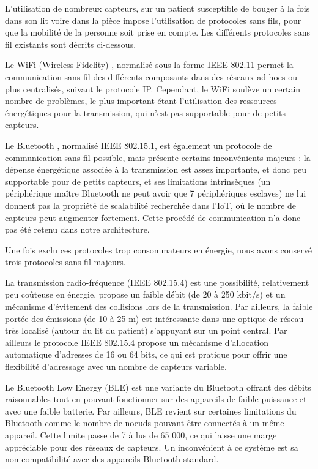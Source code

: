 \documentclass{article}
\begin{document}
L’utilisation de nombreux capteurs, sur un patient susceptible de bouger à la fois dans son lit voire dans la pièce impose l’utilisation de protocoles sans fils, pour que la mobilité de la personne soit prise en compte. Les différents protocoles sans fil existants sont décrits ci-dessous.

Le WiFi (Wireless Fidelity) \cite{Wifi}, normalisé sous la forme IEEE 802.11 permet la communication sans fil des différents composants dans des réseaux ad-hocs ou plus centralisés, suivant le protocole IP. Cependant, le WiFi soulève un certain nombre de problèmes, le plus important étant l'utilisation des ressources énergétiques pour la transmission, qui n’est pas supportable pour de petits capteurs.

Le Bluetooth \cite{Bluetooth}, normalisé IEEE 802.15.1, est également un protocole de communication sans fil possible, mais présente certains inconvénients majeurs : la dépense énergétique associée à la transmission est assez importante, et donc peu supportable pour de petits capteurs, et ses limitations intrinsèques (un périphérique maître Bluetooth ne peut avoir que 7 périphériques esclaves) ne lui donnent pas la propriété de scalabilité recherchée dans l'IoT, où le nombre de capteurs peut augmenter fortement. Cette procédé de communication n'a donc pas été retenu dans notre architecture.

Une fois exclu ces protocoles trop consommateurs en énergie, nous avons conservé trois protocoles sans fil majeurs.

La transmission radio-fréquence (IEEE 802.15.4) \cite{1IEEE802.15.4} \cite{2IEEE802.15.4} est une possibilité, relativement peu coûteuse en énergie, propose un faible débit (de 20 à 250 kbit/s) et un mécanisme d’évitement des collisions lors de la transmission. Par ailleurs, la faible portée des émissions (de 10 à 25 m) est intéressante dans une optique de réseau très localisé (autour du lit du patient) s’appuyant sur un point central. Par ailleurs le protocole IEEE 802.15.4 propose un mécanisme d’allocation automatique d’adresses de 16 ou 64 bits, ce qui est pratique pour offrir une flexibilité d’adressage avec un nombre de capteurs variable.

Le Bluetooth Low Energy (BLE) \cite{BLE} est une variante du Bluetooth offrant des débits raisonnables tout en pouvant fonctionner sur des appareils de faible puissance et avec une faible batterie. Par ailleurs, BLE revient sur certaines limitations du Bluetooth comme le nombre de noeuds pouvant être connectés à un même appareil. Cette limite passe de 7 à lus de 65 000, ce qui laisse une marge appréciable pour des réseaux de capteurs. Un inconvénient à ce système est sa non compatibilité avec des appareils Bluetooth standard.
\end{document}

